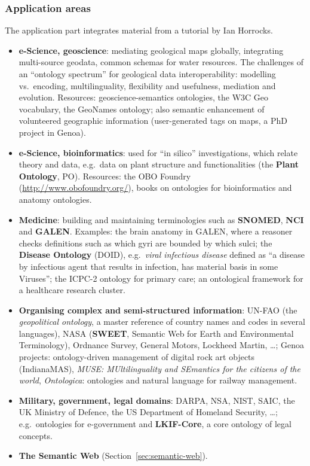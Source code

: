 \subsubsection{Application areas}

The application part integrates material from a tutorial by Ian Horrocks.

\begin{itemize}
  \item \textbf{e-Science, geoscience}: mediating geological maps globally, integrating
        multi-source geodata, common schemas for water resources. The challenges of an
        ``ontology spectrum'' for geological data interoperability: modelling vs.\
        encoding, multilinguality, flexibility and usefulness, mediation and evolution.
        Resources: geoscience-semantics ontologies, the W3C Geo vocabulary, the GeoNames
        ontology; also semantic enhancement of volunteered geographic information
        (user-generated tags on maps, a PhD project in Genoa).
  \item \textbf{e-Science, bioinformatics}: used for ``in silico'' investigations, which
        relate theory and data, e.g.\ data on plant structure and functionalities
        (the \textbf{Plant Ontology}, PO). Resources: the OBO Foundry
        (\url{http://www.obofoundry.org/}), books on ontologies for bioinformatics and
        anatomy ontologies.
  \item \textbf{Medicine}: building and maintaining terminologies such as
        \textbf{SNOMED}, \textbf{NCI} and \textbf{GALEN}. Examples: the brain anatomy in
        GALEN, where a reasoner checks definitions such as which gyri are bounded by
        which sulci; the \textbf{Disease Ontology} (DOID), e.g.\ \emph{viral infectious
        disease} defined as ``a disease by infectious agent that results in infection,
        has material basis in some Viruses''; the ICPC-2 ontology for primary care; an
        ontological framework for a healthcare research cluster.
  \item \textbf{Organising complex and semi-structured information}: UN-FAO (the
        \emph{geopolitical ontology}, a master reference of country names and codes in
        several languages), NASA (\textbf{SWEET}, Semantic Web for Earth and
        Environmental Terminology), Ordnance Survey, General Motors, Lockheed Martin,
        \ldots; Genoa projects: ontology-driven management of digital rock art objects
        (IndianaMAS), \emph{MUSE: MUltilinguality and SEmantics for the citizens of the
        world}, \emph{Ontologica}: ontologies and natural language for railway
        management.
  \item \textbf{Military, government, legal domains}: DARPA, NSA, NIST, SAIC, the UK
        Ministry of Defence, the US Department of Homeland Security, \ldots; e.g.\
        ontologies for e-government and \textbf{LKIF-Core}, a core ontology of legal
        concepts.
  \item \textbf{The Semantic Web} (Section~\ref{sec:semantic-web}).
\end{itemize}

